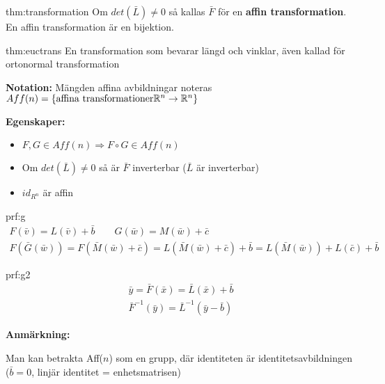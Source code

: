 \par\bigskip
\begin{theo}{thm:transformation}
  Om $det(\bar{L}) \neq 0$ så kallas $\bar{F}$ för en \textbf{affin transformation}. En affin transformation är en bijektion.
\end{theo}
\par\bigskip
\begin{theo}{thm:euctrans}
  En transformation som bevarar längd och vinklar, även kallad för ortonormal transformation
\end{theo}
\par\bigskip
\noindent\textbf{Notation:} Mängden affina avbildningar noteras $Aff(n) = \{\text{affina transformationer} \mathbb{R}^n\to\mathbb{R}^n\}$
\par\bigskip
\noindent\textbf{Egenskaper:}
\begin{itemize}
  \item $F,G\in Aff(n)\Rightarrow F\circ G\in Aff(n)$
  \item Om $det(\bar{L})\neq0$ så är $\bar{F}$ inverterbar ($\bar{L}$ är inverterbar)
  \item $id_{R^n}$ är affin 
\end{itemize}
\par\bigskip
\begin{prf}[Egenskap 1]{prf:g}
  \begin{equation*}
    \begin{gathered}
      F(\bar{v}) = L(\bar{v})+\bar{b}\qquad G(\bar{w}) = M(\bar{w})+\bar{c}\\
      F(\bar{G}(\bar{w})) = F(\bar{M}(\bar{w})+\bar{c})=L(\bar{M}(\bar{w})+\bar{c})+\bar{b} = L(\bar{M}(\bar{w}))+L(\bar{c})+\bar{b}
    \end{gathered}
  \end{equation*}
\end{prf}
\newpage
\begin{prf}[Egenskap 2]{prf:g2}
  \begin{equation*}
    \begin{gathered}
      \bar{y} = \bar{F}(\bar{x}) = \bar{L}(\bar{x})+\bar{b}\\
      \bar{F}^{-1}(\bar{y}) = \bar{L}^{-1}(\bar{y}-\bar{b})
    \end{gathered}
  \end{equation*}
\end{prf}
\par\bigskip
\noindent\textbf{Anmärkning:}\par
\noindent Man kan betrakta Aff($n$) som en grupp, där identiteten är identitetsavbildningen ($\bar{b} = 0$, linjär identitet = enhetsmatrisen)
